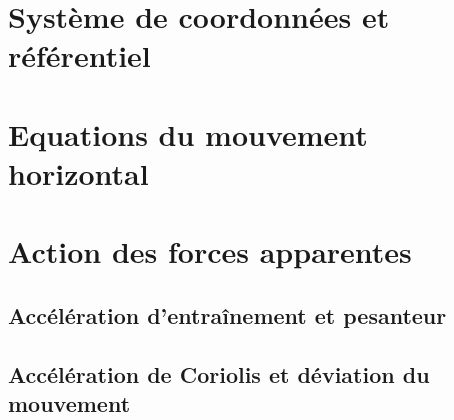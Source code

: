 \documentclass[a4paper,DIV16,10pt]{scrartcl}
\begin{document}
 \inidoc

\mk \section{Système de coordonnées et référentiel}
	

\mk \section{Equations du mouvement horizontal}
	

\mk \section{Action des forces apparentes}

	\sk \subsection{Accélération d'entraînement et pesanteur}
	

	\sk \subsection{Accélération de Coriolis et déviation du mouvement}
	
\end{document}
